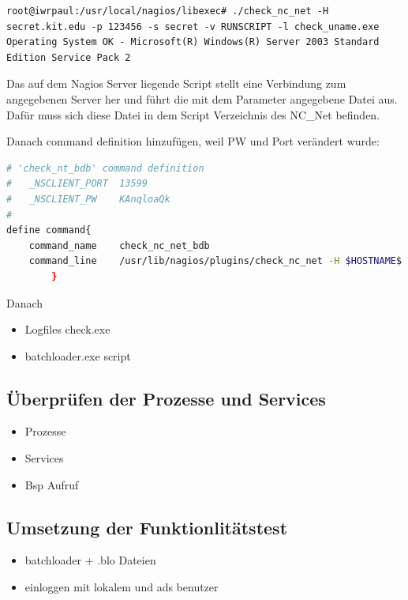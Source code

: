 \begin{lstlisting}[captionpos=b, caption=Aufruf eines aktiven Checks, label=activecheckexample, breaklines = true]
root@iwrpaul:/usr/local/nagios/libexec# ./check_nc_net -H secret.kit.edu -p 123456 -s secret -v RUNSCRIPT -l check_uname.exe
Operating System OK - Microsoft(R) Windows(R) Server 2003 Standard Edition Service Pack 2
\end{lstlisting}

Das auf dem Nagios Server liegende Script  stellt eine Verbindung zum angegebenen Server her und führt die mit dem Parameter  angegebene Datei aus. Dafür muss sich diese Datei in dem Script Verzeichnis des NC\_Net befinden.


Danach command definition hinzufügen, weil PW und Port verändert wurde:
\begin{lstlisting}[captionpos=b, caption=Nagios-Befehls Definition für den Host, label=activecheckexample, breaklines = true, language=sh]
# 'check_nt_bdb' command definition
#	_NSCLIENT_PORT	13599
#	_NSCLIENT_PW	KAnqloaQk
#
define command{
    command_name    check_nc_net_bdb
	command_line 	/usr/lib/nagios/plugins/check_nc_net -H $HOSTNAME$ -p 13599 -s KAnqloaQk -v $ARG1$
        }
\end{lstlisting}

Danach
\begin{itemize}
\item Logfiles check.exe 
\item batchloader.exe script
\end{itemize}


\subsection{Überprüfen der Prozesse und Services}
\begin{itemize}
\item Prozesse
\item Services
\item Bsp Aufruf
\end{itemize}

\subsection{Umsetzung der Funktionlitätstest}
\begin{itemize}
\item batchloader + .blo Dateien
\item einloggen mit lokalem und ads benutzer
\end{itemize}



